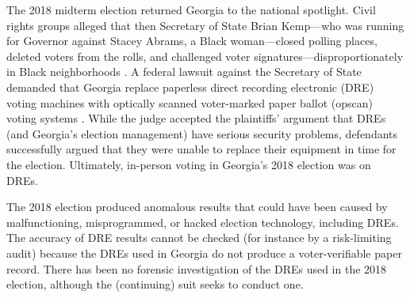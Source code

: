 \documentclass[runningheads]{llncs}
\begin{document}
The 2018 midterm election returned Georgia to the national spotlight.
Civil rights groups alleged that then Secretary of State Brian Kemp---who was running for Governor against Stacey Abrams, a Black woman---closed polling places, deleted voters from the rolls, and challenged
voter signatures---disproportionately in Black neighborhoods \cite{harnik_officials_2018,nadler_voting_2018,niesse_voting_2018}.
A federal lawsuit against the Secretary of State demanded that Georgia replace 
paperless direct recording electronic (DRE) voting machines with optically scanned voter-marked paper ballot
(opscan) voting systems \cite{curling_kemp_2018}.
While the judge accepted the plaintiffs' argument that DREs (and Georgia's election management)
have serious security problems, defendants successfully argued
that they were unable to replace their equipment in time for the election.
Ultimately, in-person voting in Georgia's 2018 election was on DREs.

The 2018 election produced anomalous results that could have been caused 
by malfunctioning, misprogrammed, or hacked election technology, including DREs.
The accuracy of DRE results cannot be checked (for instance
by a risk-limiting audit)
because the DREs used in Georgia do not produce a voter-verifiable paper record.
There has been no forensic investigation of the DREs used in the 2018 election, although the (continuing)
suit seeks to conduct one.
\end{document}
